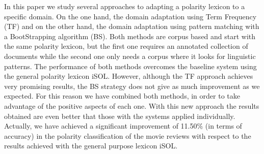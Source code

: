In this paper we study several approaches to adapting a polarity lexicon to a specific domain. On the one hand, the domain adaptation using Term Frequency (TF) and on the other hand, the domain adaptation using pattern matching with a BootStrapping algorithm (BS). Both methods are corpus based and start with the same polarity lexicon, but the first one requires an annotated collection of documents while the second one only needs a corpus where it looks for linguistic patterns. The performance of both methods overcomes the baseline system using the general polarity lexicon iSOL. However, although the TF approach achieves very promising results, the BS strategy does not give as much improvement as we expected. For this reason we have combined both methods, in order to take advantage of the positive aspects of each one. With this new approach the results obtained are even better that those with the systems applied individually. Actually, we have achieved a significant improvement of 11.50\% (in terms of accuracy) in the polarity classification of the movie reviews with respect to the results achieved with the general purpose lexicon iSOL.
